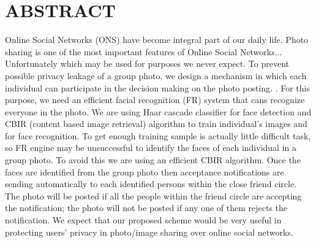 \chapter*{ABSTRACT}
Online Social Networks (ONS) have become integral part of our daily life. Photo sharing is one of the most important features of Online Social Networks... Unfortunately which may be used for purposes we never expect. To prevent possible privacy leakage of a group photo, we design a mechanism in which each individual can participate in the decision making on the photo posting. . For this purpose, we need an efficient facial recognition (FR) system that cans recognize everyone in the photo. We are using  Haar cascade classifier for  face detection and CBIR (content based image retrieval) algorithm to train individual’s images and for face recognition. To get enough training sample is actually little difficult task, so FR engine may be unsuccessful to identify the faces of each individual in a group photo. To avoid this we are using an efficient CBIR algorithm. Once the faces are identified from the group photo then acceptance notifications are sending automatically to each identified persons within the close friend circle. The photo will be posted if all the people within the friend circle are accepting the notification; the photo will not be posted if any one of them rejects the notification. We expect that our proposed scheme would be very useful in protecting users’ privacy in photo/image sharing over online social networks.







